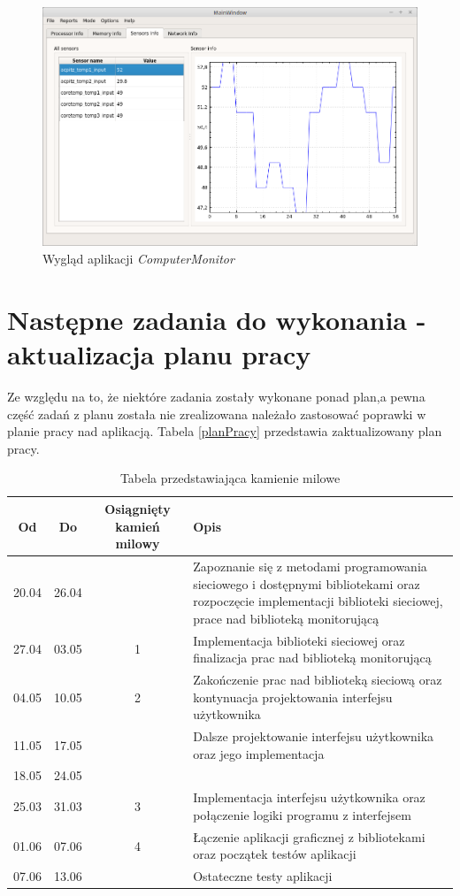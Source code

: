 \documentclass[a4paper]{article}
\begin{document}
\begin{figure}[h]
	\centering
	\includegraphics[width=\linewidth]{img/wygladAplikacji.png}
	\caption{Wygląd aplikacji \textit{ComputerMonitor}}
	\label{wygladAplikacji}
\end{figure}



\section{Następne zadania do wykonania - aktualizacja planu pracy}
Ze względu na to, że niektóre zadania zostały wykonane ponad plan,a pewna część zadań z planu została nie zrealizowana należało zastosować poprawki w planie pracy nad aplikacją. Tabela \ref{planPracy} przedstawia zaktualizowany plan pracy.

\begin{table}[h]
			\centering
			\begin{tabularx}{0.8\textwidth}{|c|c|c|X|}
				\hline
				Od & Do & Osiągnięty kamień milowy & Opis \\ \hline
				20.04 & 26.04 &  & Zapoznanie się z metodami programowania sieciowego i dostępnymi bibliotekami oraz  rozpoczęcie implementacji biblioteki sieciowej, prace nad biblioteką monitorującą\\ \hline
				27.04 & 03.05 & 1 & Implementacja biblioteki sieciowej oraz finalizacja prac nad biblioteką monitorującą \\ \hline
				04.05 & 10.05 & 2 & Zakończenie prac nad biblioteką sieciową oraz kontynuacja projektowania interfejsu użytkownika \\ \hline
				11.05 & 17.05 &    & Dalsze projektowanie interfejsu użytkownika oraz jego implementacja \\ \hline
				18.05 & 24.05 &  &  \\ \hline
				25.03 & 31.03 & 3 & Implementacja interfejsu użytkownika oraz połączenie logiki programu z interfejsem \\ \hline
				01.06 & 07.06 & 4 & Łączenie aplikacji graficznej z bibliotekami oraz początek testów aplikacji \\ \hline
				07.06 & 13.06 &  & Ostateczne testy aplikacji \\ \hline
			\end{tabularx}
			\caption{Tabela przedstawiająca kamienie milowe}
			\label{tabela_harmonogram}
		\end{table}
\end{document}
